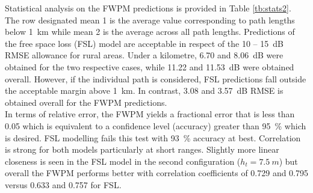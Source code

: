 \documentclass[10pt,journal,twoside]{IEEEtran}
\begin{document}
Statistical analysis on the FWPM predictions is provided in Table \ref{tb:stats2}. The row designated mean 1 is the average value corresponding to path lengths below \SI{1}{km} while mean 2 is the average across all path lengths. Predictions of the free space loss (FSL) model are acceptable in respect of the \SI{10}{} -- \SI{15}{dB} RMSE allowance for rural areas. Under a kilometre, \SI{6.70}{} and \SI{8.06}{dB} were obtained for the two respective cases, while \SI{11.22}{} and \SI{11.53}{dB} were obtained overall. However, if the individual path is considered, FSL predictions fall outside the acceptable margin above \SI{1}{km}. In contrast, \SI{3.08}{} and \SI{3.57}{dB} RMSE is obtained overall for the FWPM predictions.\\
In terms of relative error, the FWPM yields a fractional error that is less than \num{0.05} which is equivalent to a confidence level (accuracy) greater than \SI{95}{\%} which is desired. FSL modelling fails this test with \SI{93}{\%} accuracy at best. Correlation is strong for both models particularly at short ranges. Slightly more linear closeness is seen in the FSL model in the second configuration ($h_t=\SI{7.5}{m}$) but overall the FWPM performs better with correlation coefficients of \num{0.729} and \num{0.795} versus \num{0.633} and \num{0.757} for FSL.
\end{document}
